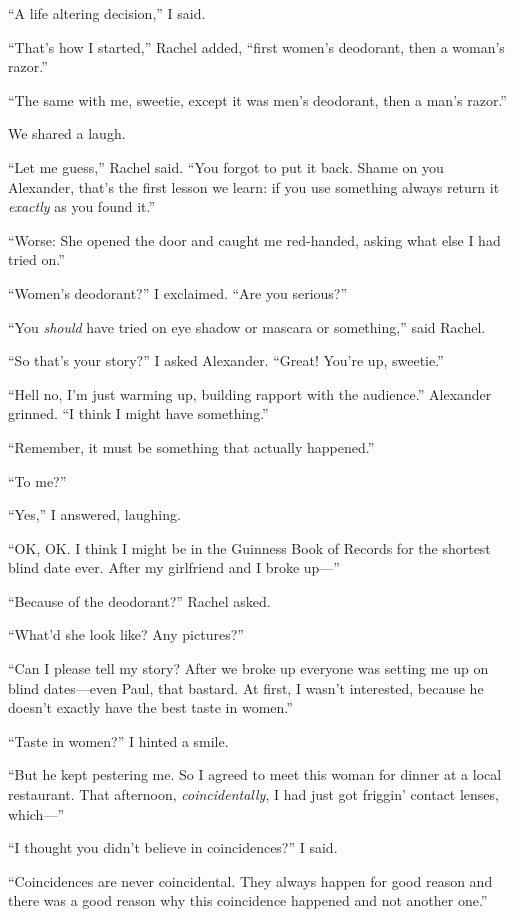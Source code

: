 ``A life altering decision,'' I said.

``That's how I started,'' Rachel added, ``first women's deodorant, then
a woman's razor.''

``The same with me, sweetie, except it was men's deodorant, then a man's
razor.''

We shared a laugh.

``Let me guess,'' Rachel said. ``You forgot to put it back. Shame on you
Alexander, that's the first lesson we learn: if you use something always
return it \emph{exactly} as you found it.''

``Worse: She opened the door and caught me red-handed, asking what else
I had tried on.''

``Women's deodorant?'' I exclaimed. ``Are you serious?''

``You \emph{should} have tried on eye shadow or mascara or something,''
said Rachel.

``So that's your story?'' I asked Alexander. ``Great! You're up,
sweetie.''

``Hell no, I'm just warming up, building rapport with the audience.''
Alexander grinned. ``I think I might have something.''

``Remember, it must be something that actually happened.''

``To me?''

``Yes,'' I answered, laughing.

``OK, OK. I think I might be in the Guinness Book of Records for the
shortest blind date ever. After my girlfriend and I broke up---''

``Because of the deodorant?'' Rachel asked.

``What'd she look like? Any pictures?''

``Can I please tell my story? After we broke up everyone was setting me
up on blind dates---even Paul, that bastard. At first, I wasn't
interested, because he doesn't exactly have the best taste in women.''

``Taste in women?'' I hinted a smile.

``But he kept pestering me. So I agreed to meet this woman for dinner at
a local restaurant. That afternoon, \emph{coincidentally}, I had just
got friggin' contact lenses, which---''

``I thought you didn't believe in coincidences?'' I said.

``Coincidences are never coincidental. They always happen for good
reason and there was a good reason why this coincidence happened and not
another one.''

